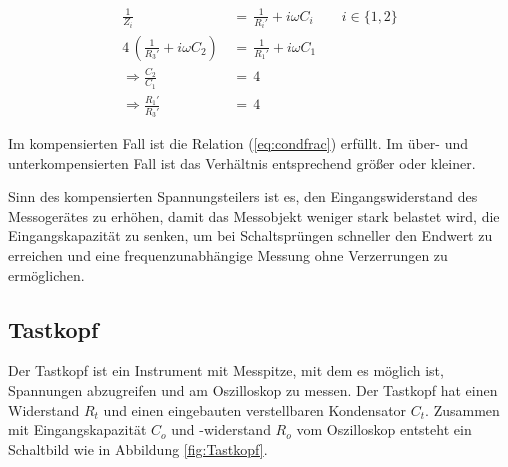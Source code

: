 \documentclass[10pt,a4paper]{scrartcl}
\begin{document}
\begin{align}
    \frac{1}{Z_i}\,&=\,\frac{1}{R_i'}+i\omega C_i\qquad i\in\{1,2\}\\
    4\,\left(\frac{1}{R_3'}+i\omega C_2\right)\,&=\,
    \frac{1}{R_1'}+i\omega C_1\\
    \label{eq:condfrac}
    \Rightarrow \frac{C_2}{C_1}\,&=\,4\\
    \Rightarrow \frac{R_1'}{R_3'}\,&=\,4
\end{align}

Im kompensierten Fall ist die Relation (\ref{eq:condfrac}) erfüllt.
Im über- und unterkompensierten Fall ist das Verhältnis entsprechend größer
oder kleiner. %

Sinn des kompensierten Spannungsteilers ist es, den Eingangswiderstand des
Messogerätes zu erhöhen, damit das Messobjekt weniger stark belastet wird,
die Eingangskapazität zu senken, um bei Schaltsprüngen schneller den Endwert
zu erreichen und eine frequenzunabhängige Messung ohne Verzerrungen zu
ermöglichen.

\subsection {Tastkopf}

Der Tastkopf ist ein Instrument mit Messpitze,
mit dem es möglich ist,
Spannungen abzugreifen und am Oszilloskop zu messen.
Der Tastkopf hat einen Widerstand $R_t$ und einen eingebauten
verstellbaren Kondensator $C_t$.
Zusammen mit Eingangskapazität $C_o$ und -widerstand $R_o$ vom
Oszilloskop entsteht ein
Schaltbild wie in Abbildung \ref{fig:Tastkopf}.
\end{document}
